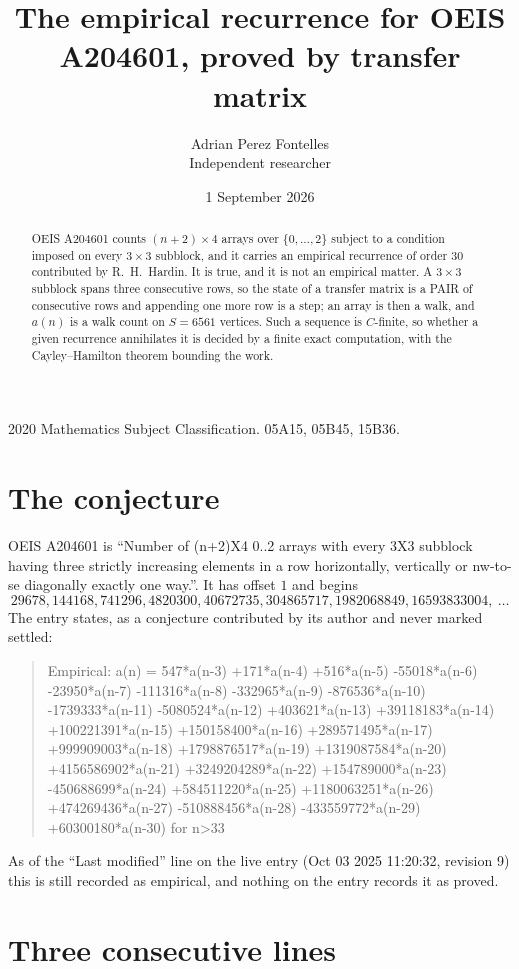 \documentclass[11pt,a4paper]{article}
\title{The empirical recurrence for OEIS A204601, proved by transfer matrix}
\author{Adrian Perez Fontelles\\ \small Independent researcher}
\date{1 September 2026}
\theoremstyle{plain}
\theoremstyle{definition}
\begin{document}
\maketitle

\begin{abstract}
OEIS A204601 counts $(n+2)\times4$ arrays over $\{0,\dots,2\}$ subject to a condition imposed on
every $3\times3$ subblock, and it carries an empirical recurrence of order $30$
contributed by R.~H.~Hardin. It is true, and it is not an empirical matter. A $3\times3$
subblock spans three consecutive rows, so the state of a transfer matrix is a PAIR of
consecutive rows and appending one more row is a step; an array is then a walk, and
$a(n)$ is a walk count on $S=6561$ vertices. Such a sequence is $C$-finite, so whether a given
recurrence annihilates it is decided by a finite exact computation, with the Cayley--Hamilton
theorem bounding the work.
\end{abstract}

\noindent\small 2020 Mathematics Subject Classification. 05A15, 05B45, 15B36.\normalsize

\section{The conjecture}

OEIS A204601 is ``Number of (n+2)X4 0..2 arrays with every 3X3 subblock having three strictly increasing elements in a row horizontally, vertically or nw-to-se diagonally exactly one way.''. It has offset $1$ and begins
\[
29678, 144168, 741296, 4820300, 40672735, 304865717, 1982068849, 16593833004,\ \dots
\]
The entry states, as a conjecture contributed by its author and never marked settled:
\begin{quote}
Empirical: a(n) = 547*a(n-3) +171*a(n-4) +516*a(n-5) -55018*a(n-6) -23950*a(n-7) -111316*a(n-8) -332965*a(n-9) -876536*a(n-10) -1739333*a(n-11) -5080524*a(n-12) +403621*a(n-13) +39118183*a(n-14) +100221391*a(n-15) +150158400*a(n-16) +289571495*a(n-17) +999909003*a(n-18) +1798876517*a(n-19) +1319087584*a(n-20) +4156586902*a(n-21) +3249204289*a(n-22) +154789000*a(n-23) -450688699*a(n-24) +584511220*a(n-25) +1180063251*a(n-26) +474269436*a(n-27) -510888456*a(n-28) -433559772*a(n-29) +60300180*a(n-30) for n>33
\end{quote}
As of the ``Last modified'' line on the live entry (Oct 03 2025 11:20:32, revision 9) this is still
recorded as empirical, and nothing on the entry records it as proved.

\section{Three consecutive lines}
\end{document}

